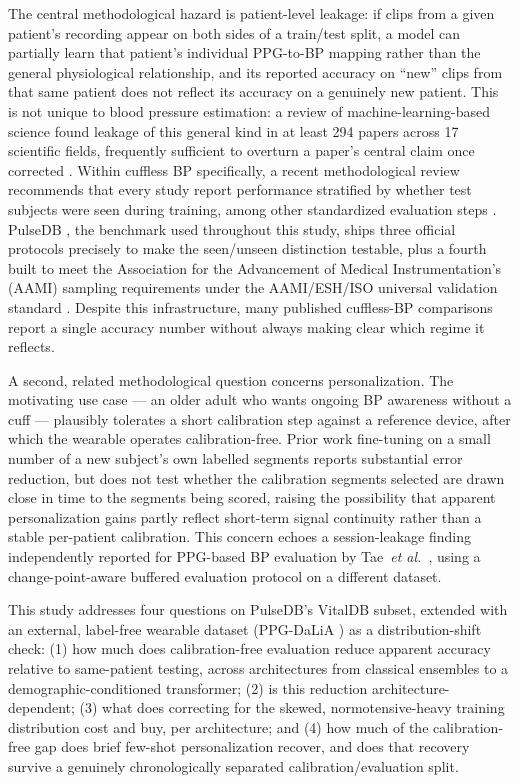 \documentclass[journal]{IEEEtran}
\begin{document}
The central methodological hazard is patient-level leakage: if clips from a given patient's recording appear on both sides of a train/test split, a model can partially learn that patient's individual PPG-to-BP mapping rather than the general physiological relationship, and its reported accuracy on ``new'' clips from that same patient does not reflect its accuracy on a genuinely new patient. This is not unique to blood pressure estimation: a review of machine-learning-based science found leakage of this general kind in at least 294 papers across 17 scientific fields, frequently sufficient to overturn a paper's central claim once corrected \cite{kapoor2023}. Within cuffless BP specifically, a recent methodological review recommends that every study report performance stratified by whether test subjects were seen during training, among other standardized evaluation steps \cite{elgendi2024}. PulseDB \cite{wang2022}, the benchmark used throughout this study, ships three official protocols precisely to make the seen/unseen distinction testable, plus a fourth built to meet the Association for the Advancement of Medical Instrumentation's (AAMI) sampling requirements under the AAMI/ESH/ISO universal validation standard \cite{stergiou2018}. Despite this infrastructure, many published cuffless-BP comparisons report a single accuracy number without always making clear which regime it reflects.

A second, related methodological question concerns personalization. The motivating use case --- an older adult who wants ongoing BP awareness without a cuff --- plausibly tolerates a short calibration step against a reference device, after which the wearable operates calibration-free. Prior work fine-tuning on a small number of a new subject's own labelled segments \cite{chen2024} reports substantial error reduction, but does not test whether the calibration segments selected are drawn close in time to the segments being scored, raising the possibility that apparent personalization gains partly reflect short-term signal continuity rather than a stable per-patient calibration. This concern echoes a session-leakage finding independently reported for PPG-based BP evaluation by Tae~\textit{et al.}~\cite{tae2026}, using a change-point-aware buffered evaluation protocol on a different dataset.

This study addresses four questions on PulseDB's VitalDB subset, extended with an external, label-free wearable dataset (PPG-DaLiA \cite{reiss2019}) as a distribution-shift check: (1) how much does calibration-free evaluation reduce apparent accuracy relative to same-patient testing, across architectures from classical ensembles to a demographic-conditioned transformer; (2) is this reduction architecture-dependent; (3) what does correcting for the skewed, normotensive-heavy training distribution cost and buy, per architecture; and (4) how much of the calibration-free gap does brief few-shot personalization recover, and does that recovery survive a genuinely chronologically separated calibration/evaluation split.
\end{document}
